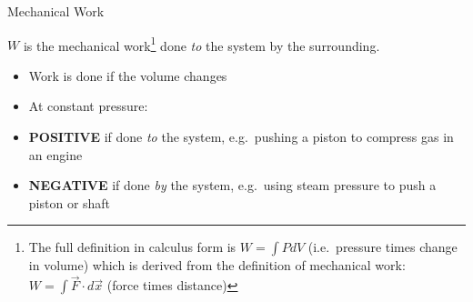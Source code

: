 \documentclass[12pt,aspectratio=169,dvipsnames]{beamer}
\begin{document}
\begin{frame}{Mechanical Work}
  
  {\color{orange}$W$} is the mechanical work\footnote{The full
    definition in calculus form is $W=\int PdV$ (i.e.\ pressure times change in
    volume) which is derived from the definition of mechanical work:
    $W=\int\vec F\cdot d\vec x$ (force times distance)} done \emph{to}
  the system by the surrounding.

  \begin{itemize}
  \item Work is done if the volume changes
  \item At constant pressure:

    
  \item\vspace{-.1in}\textbf{POSITIVE} if done \emph{to} the system, e.g.\
    pushing a piston to compress gas in an engine
  \item\textbf{NEGATIVE} if done \emph{by} the system, e.g.\ using steam
    pressure to push a piston or shaft
  \end{itemize}
  \vspace{.4in}
\end{frame}
\end{document}
